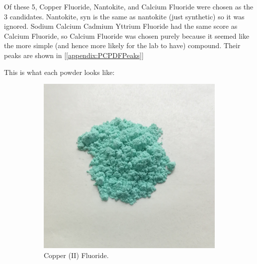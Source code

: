 \documentclass{article}
\begin{document}
Of these 5, Copper Fluoride, Nantokite, and Calcium Fluoride were chosen as the 3 candidates. Nantokite, syn is the same as nantokite (just synthetic) so it was ignored. Sodium Calcium Cadmium Yttrium Fluoride had the same score as Calcium Fluoride, so Calcium Fluoride was chosen purely because it seemed like the more simple (and hence more likely for the lab to have) compound. Their peaks are shown in [\ref{appendix:PCPDFPeaks}] 

\pagebreak{}

	This is what each powder looks like:

\begin{figure}[h]
	\centering
	\begin{subfigure}{0.45\textwidth}
		\centering
		\includegraphics[width=\textwidth]{Figures/CuF2.jpg}
		\caption{Copper (II) Fluoride. \cite{leiem_2019_copperii} }
		\label{fig:CuF2}
	\end{subfigure}
	\hfill
	\begin{subfigure}{0.45\textwidth}
		\centering

\end{subfigure}
\end{figure}
\end{document}
